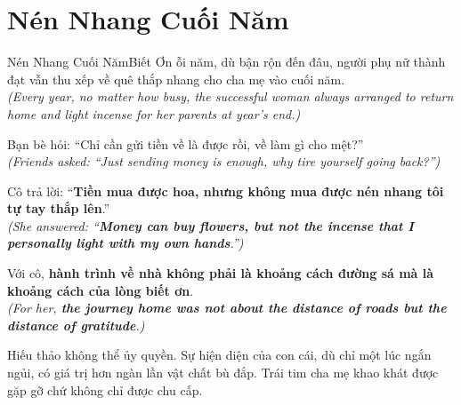 \section{Nén Nhang Cuối Năm}
\begin{truyen}{Nén Nhang Cuối Năm}{Biết Ơn}
ỗi năm, dù bận rộn đến đâu, người phụ nữ thành đạt vẫn thu xếp về quê thắp nhang cho cha mẹ vào cuối năm.\\
\textit{(Every year, no matter how busy, the successful woman always arranged to return home and light incense for her parents at year's end.)}

Bạn bè hỏi: ``Chỉ cần gửi tiền về là được rồi, về làm gì cho mệt?''\\
\textit{(Friends asked: ``Just sending money is enough, why tire yourself going back?'')}

Cô trả lời: ``\textbf{Tiền mua được hoa, nhưng không mua được nén nhang tôi tự tay thắp lên}.''\\
\textit{(She answered: ``\textbf{Money can buy flowers, but not the incense that I personally light with my own hands}.'')}

Với cô, \textbf{hành trình về nhà không phải là khoảng cách đường sá mà là khoảng cách của lòng biết ơn}.\\
\textit{(For her, \textbf{the journey home was not about the distance of roads but the distance of gratitude}.)}
\end{truyen}
\begin{baihoc}
  Hiếu thảo không thể ủy quyền. Sự hiện diện của con cái, dù chỉ một lúc ngắn ngủi, có giá trị hơn ngàn lần vật chất bù đắp. Trái tim cha mẹ khao khát được gặp gỡ chứ không chỉ được chu cấp.
\end{baihoc}

